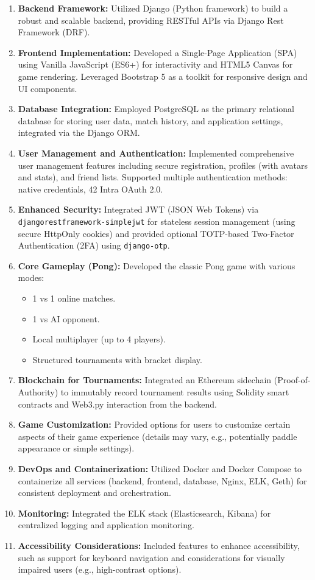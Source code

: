 \begin{enumerate}
    \item \textbf{Backend Framework:} Utilized Django (Python framework) to build a robust and scalable backend, providing RESTful APIs via Django Rest Framework (DRF).
    \item \textbf{Frontend Implementation:} Developed a Single-Page Application (SPA) using Vanilla JavaScript (ES6+) for interactivity and HTML5 Canvas for game rendering. Leveraged Bootstrap 5 as a toolkit for responsive design and UI components.
    \item \textbf{Database Integration:} Employed PostgreSQL as the primary relational database for storing user data, match history, and application settings, integrated via the Django ORM.
    \item \textbf{User Management and Authentication:} Implemented comprehensive user management features including secure registration, profiles (with avatars and stats), and friend lists. Supported multiple authentication methods: native credentials, 42 Intra OAuth 2.0.
    \item \textbf{Enhanced Security:} Integrated JWT (JSON Web Tokens) via \texttt{djangorestframework-simplejwt} for stateless session management (using secure HttpOnly cookies) and provided optional TOTP-based Two-Factor Authentication (2FA) using \texttt{django-otp}.
    \item \textbf{Core Gameplay (Pong):} Developed the classic Pong game with various modes:
        \begin{itemize}
            \item 1 vs 1 online matches.
            \item 1 vs AI opponent.
            \item Local multiplayer (up to 4 players).
            \item Structured tournaments with bracket display.
        \end{itemize}
    \item \textbf{Blockchain for Tournaments:} Integrated an Ethereum sidechain (Proof-of-Authority) to immutably record tournament results using Solidity smart contracts and Web3.py interaction from the backend.
    \item \textbf{Game Customization:} Provided options for users to customize certain aspects of their game experience (details may vary, e.g., potentially paddle appearance or simple settings).
    \item \textbf{DevOps and Containerization:} Utilized Docker and Docker Compose to containerize all services (backend, frontend, database, Nginx, ELK, Geth) for consistent deployment and orchestration.
    \item \textbf{Monitoring:} Integrated the ELK stack (Elasticsearch, Kibana) for centralized logging and application monitoring.
    \item \textbf{Accessibility Considerations:} Included features to enhance accessibility, such as support for keyboard navigation and considerations for visually impaired users (e.g., high-contrast options).
\end{enumerate}

